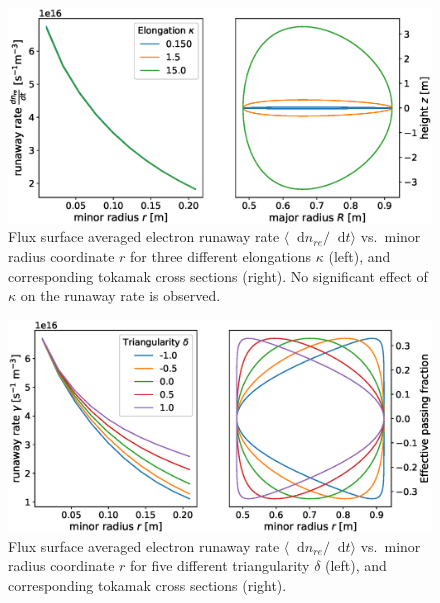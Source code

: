 \documentclass[11pt,a4paper]{article}
\newcommand*\diff{\mathop{}\!\mathrm{d}}
\begin{document}
\begin{figure}[H]
    \centering
    \captionsetup{width=.8\textwidth}
    \includegraphics[width=\textwidth]{figs/elongation.eps}
    \caption{Flux surface averaged electron runaway rate $\langle\diff{n}_{re}/\diff{t}\rangle$ vs.\ minor radius coordinate $r$ for three different elongations $\kappa$ (left), and corresponding tokamak cross sections (right).
    No significant effect of $\kappa$ on the runaway rate is observed.}
    \label{fig:elongation}
\end{figure}

\begin{figure}[H]
    \centering
    \captionsetup{width=.8\textwidth}
    \includegraphics[width=\textwidth]{figs/triangularity.eps}
    \caption{Flux surface averaged electron runaway rate $\langle\diff{n}_{re}/\diff{t}\rangle$ vs.\ minor radius coordinate $r$ for five different triangularity $\delta$ (left), and corresponding tokamak cross sections (right).}
    \label{fig:triangularity}
\end{figure}
\end{document}
